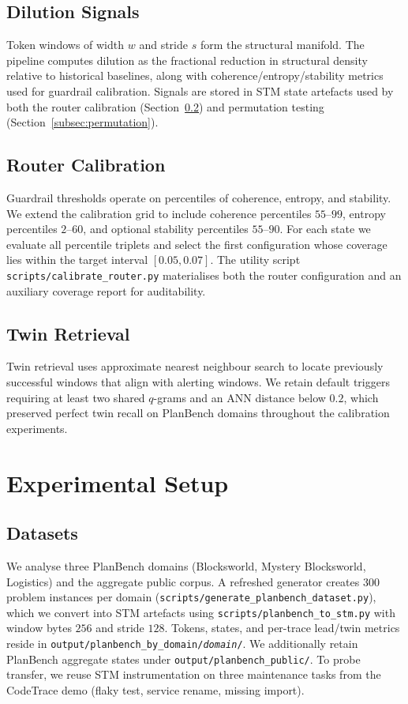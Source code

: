 \documentclass[11pt]{article}
\begin{document}
\subsection{Dilution Signals}
Token windows of width $w$ and stride $s$ form the structural manifold. The
pipeline computes dilution as the fractional reduction in structural density
relative to historical baselines, along with coherence/entropy/stability metrics
used for guardrail calibration. Signals are stored in STM state artefacts used by
both the router calibration (Section~\ref{subsec:calibration}) and permutation
testing (Section~\ref{subsec:permutation}).

\subsection{Router Calibration}
\label{subsec:calibration}
Guardrail thresholds operate on percentiles of coherence, entropy, and stability.
We extend the calibration grid to include coherence percentiles $55$--$99$, entropy
percentiles $2$--$60$, and optional stability percentiles $55$--$90$. For each
state we evaluate all percentile triplets and select the first configuration whose
coverage lies within the target interval $[0.05, 0.07]$. The utility script
\texttt{scripts/calibrate\_router.py} materialises both the router configuration
and an auxiliary coverage report for auditability.

\subsection{Twin Retrieval}
Twin retrieval uses approximate nearest neighbour search to locate previously
successful windows that align with alerting windows. We retain default triggers
requiring at least two shared $q$-grams and an ANN distance below $0.2$, which
preserved perfect twin recall on PlanBench domains throughout the calibration
experiments.

\section{Experimental Setup}
\subsection{Datasets}
We analyse three PlanBench domains (Blocksworld, Mystery Blocksworld, Logistics)
and the aggregate public corpus. A refreshed generator creates 300 problem
instances per domain (\texttt{scripts/generate\_planbench\_dataset.py}), which we
convert into STM artefacts using \texttt{scripts/planbench\_to\_stm.py} with
window bytes $256$ and stride $128$. Tokens, states, and per-trace lead/twin
metrics reside in \texttt{output/planbench\_by\_domain/\textit{domain}/}. We
additionally retain PlanBench aggregate states under
\texttt{output/planbench\_public/}. To probe transfer, we reuse STM
instrumentation on three maintenance tasks from the CodeTrace demo (flaky test,
service rename, missing import).
\end{document}
